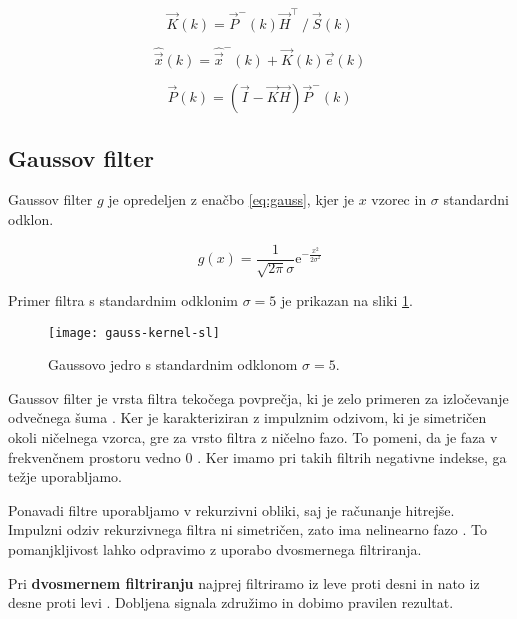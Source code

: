 \begin{equation}
\vec{K}(k) = {\vec{P}^-(k) \vec{H}^\top} ~/~ {\vec{S}(k)}
\label{eq:ojacanje}
\end{equation}

\begin{equation}
\hat{\vec{x}}(k) = \hat{\vec{x}}^-(k) + \vec{K}(k) \vec{e}(k)
\label{eq:aposteriori-stanje}
\end{equation}

\begin{equation}
\vec{P}(k) = \left( \vec{I} - \vec{K} \vec{H} \right) \vec{P}^-(k)
\label{eq:aposteriori-p}
\end{equation}








\subsection{Gaussov filter}\label{sec:gaussov-filter}
Gaussov filter $g$ je opredeljen z enačbo \eqref{eq:gauss}, kjer je $x$ vzorec in $\sigma$ standardni odklon. 


\begin{equation}
g(x) = \frac{1}{\sqrt{2 \pi} \sigma} \mathrm{e}^{-\frac{x^2}{2 \sigma^2}} 
\label{eq:gauss}
\end{equation}


Primer filtra s standardnim odklonim $\sigma = 5$ je prikazan na sliki \ref{fig:gauss}.

\begin{figure}[!htb]
\centering
\texttt{[image: gauss-kernel-sl]}
\caption[Gaussovo jedro s standardnim odklonom $\sigma=5$]{Gaussovo jedro s standardnim odklonom $\sigma=5$. }
\label{fig:gauss}
\end{figure}


Gaussov filter je vrsta filtra tekočega povprečja, ki je zelo primeren za izločevanje odvečnega šuma \cite{smith1997scientist}. Ker je karakteriziran z impulznim odzivom, ki je simetričen okoli ničelnega vzorca, gre za vrsto filtra z ničelno fazo. To pomeni, da je faza v frekvenčnem prostoru vedno $0$ \cite{smith1997scientist}. Ker imamo pri takih filtrih negativne indekse, ga težje uporabljamo. 

Ponavadi filtre uporabljamo v rekurzivni obliki, saj je računanje hitrejše. Impulzni odziv rekurzivnega filtra ni simetričen, zato ima nelinearno fazo \cite{smith1997scientist}. To pomanjkljivost lahko odpravimo z uporabo dvosmernega filtriranja.

Pri \textbf{dvosmernem filtriranju} najprej filtriramo iz leve proti desni in nato iz desne proti levi \cite{smith1997scientist}. Dobljena signala združimo in dobimo pravilen rezultat.


